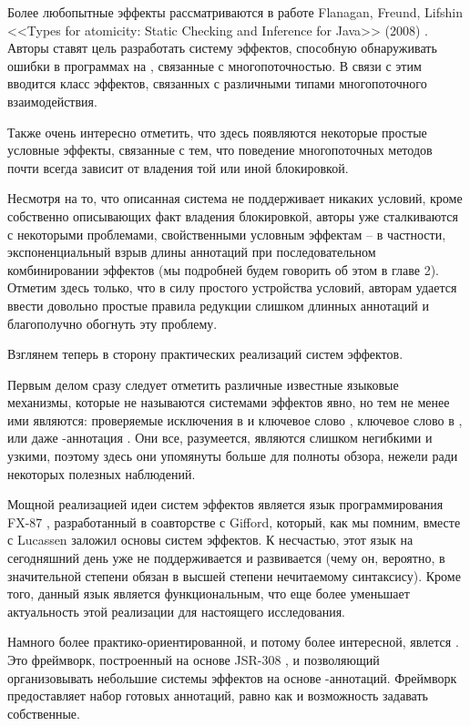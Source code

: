 Более любопытные эффекты рассматриваются в работе Flanagan, Freund, Lifshin <<Types for atomicity: Static Checking and Inference for Java>> (2008) \cite{Flanagan08}. Авторы ставят цель разработать систему эффектов, способную обнаруживать ошибки в программах на , связанные с многопоточностью. В связи с этим вводится класс эффектов, связанных с различными типами многопоточного взаимодействия. 

Также очень интересно отметить, что здесь появляются некоторые простые условные эффекты, связанные с тем, что поведение многопоточных методов почти всегда зависит от владения той или иной блокировкой. 

Несмотря на то, что описанная система не поддерживает никаких условий, кроме собственно описывающих факт владения блокировкой, авторы уже сталкиваются с некоторыми проблемами, свойственными условным эффектам -- в частности, экспоненциальный взрыв длины аннотаций при последовательном комбинировании эффектов (мы подробней будем говорить об этом в главе 2). Отметим здесь только, что в силу простого устройства условий, авторам удается ввести довольно простые правила редукции слишком длинных аннотаций и благополучно обогнуть эту проблему.


\bigskip

Взглянем теперь в сторону практических реализаций систем эффектов. 

Первым делом сразу следует отметить различные известные языковые механизмы, которые не называются системами эффектов явно, но тем не менее ими являются: проверяемые исключения в  и ключевое слово , ключевое слово  в , или даже -аннотация . Они все, разумеется, являются слишком негибкими и узкими, поэтому здесь они упомянуты больше для полноты обзора, нежели ради некоторых полезных наблюдений.

Мощной реализацией идеи систем эффектов является язык программирования FX-87 \cite{FX87}, разработанный в соавторстве с Gifford, который, как мы помним, вместе с Lucassen заложил основы систем эффектов. К несчастью, этот язык на сегодняшний день уже не поддерживается и развивается (чему он, вероятно, в значительной степени обязан в высшей степени нечитаемому синтаксису). Кроме того, данный язык является функциональным, что еще более уменьшает актуальность этой реализации для настоящего исследования.

Намного более практико-ориентированной, и потому более интересной, явлется  \cite{checker-framework}. Это фреймворк, построенный на основе JSR-308 \cite{JSR308}, и позволяющий организовывать небольшие системы эффектов на основе -аннотаций. Фреймворк предоставляет набор готовых аннотаций, равно как и возможность задавать собственные.

